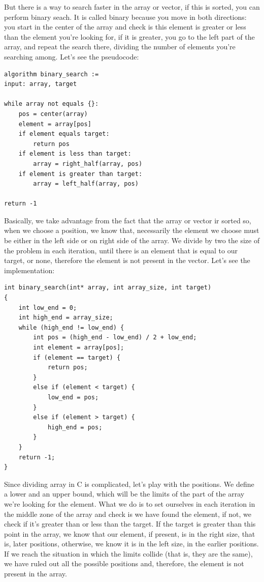 \documentclass[a4paper]{article}
\begin{document}
But there is a way to search faster in the array or vector, if this is sorted,
you can perform binary seach. It is called binary because you move in both
directions: you start in the center of the array and check is this element
is greater or less than the element you're looking for, if it is greater, you
go to the left part of the array, and repeat the search there, dividing the
number of elements you're searching among. Let's see the pseudocode:

\noindent
\begin{minipage}[H]{\linewidth}
\begin{lstlisting}[style=pseudoCode]
algorithm binary_search :=
input: array, target

while array not equals {}:
    pos = center(array)
    element = array[pos]
    if element equals target:
        return pos
    if element is less than target:
        array = right_half(array, pos)
    if element is greater than target:
        array = left_half(array, pos)

return -1
\end{lstlisting}
\end{minipage}

Basically, we take advantage from the fact that the array or vector ir sorted
so, when we choose a position, we know that, necessarily the element we choose
must be either in the left side or on right side of the array. We divide by two
the size of the problem in each iteration, until there is an element that is
equal to our target, or none, therefore the element is not present in the
vector. Let's see the implementation:

\noindent
\begin{minipage}[H]{\linewidth}
\mbox{}
\begin{lstlisting}[style=C,
caption={Binary seach algorithm implementation},
label={lst:binarySearch}]
int binary_search(int* array, int array_size, int target)
{
    int low_end = 0;
    int high_end = array_size;
    while (high_end != low_end) {
        int pos = (high_end - low_end) / 2 + low_end;
        int element = array[pos];
        if (element == target) {
            return pos;
        }
        else if (element < target) {
            low_end = pos;
        }
        else if (element > target) {
            high_end = pos;
        }
    }
    return -1;
}
\end{lstlisting}
\end{minipage}

Since dividing array in C is complicated, let's play with the positions. We
define a lower and an upper bound, which will be the limits of the part of
the array we're looking for the element. What we do is to set ourselves in each
iteration in the middle zone of the array and check is we have found the
element, if not, we check if it's greater than or less than the target. If the
target is greater than this point in the array, we know that our element, if
present, is in the right size, that is, later positions, otherwise, we know
it is in the left size, in the earlier positions. If we reach the situation in
which the limits collide (that is, they are the same), we have ruled out all the
possible positions and, therefore, the element is not present in the array.
\end{document}
